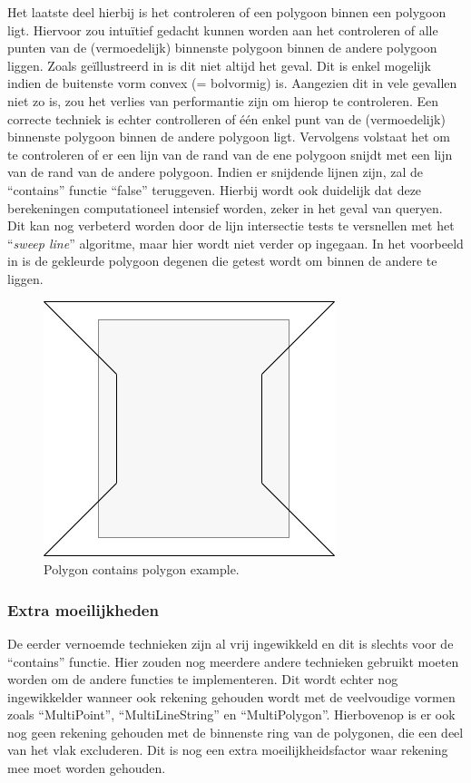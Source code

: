 Het laatste deel hierbij is het controleren of een polygoon binnen een polygoon ligt. Hiervoor zou intuïtief gedacht kunnen worden aan het controleren of alle punten van de (vermoedelijk) binnenste polygoon binnen de andere polygoon liggen. Zoals geïllustreerd in  is dit niet altijd het geval. Dit is enkel mogelijk indien de buitenste vorm convex (= bolvormig) is. Aangezien dit in vele gevallen niet zo is, zou het verlies van performantie zijn om hierop te controleren. Een correcte techniek is echter controlleren of één enkel punt van de (vermoedelijk) binnenste polygoon binnen de andere polygoon ligt. Vervolgens volstaat het om te controleren of er een lijn van de rand van de ene polygoon snijdt met een lijn van de rand van de andere polygoon. Indien er snijdende lijnen zijn, zal de ``contains'' functie ``false'' teruggeven. Hierbij wordt ook duidelijk dat deze berekeningen computationeel intensief worden, zeker in het geval van queryen. Dit kan nog verbeterd worden door de lijn intersectie tests te versnellen met het ``\textit{sweep line}'' algoritme, maar hier wordt niet verder op ingegaan. In het voorbeeld in  is de gekleurde polygoon degenen die getest wordt om binnen de andere te liggen.

\begin{figure}
    \centering
    \includegraphics[width=0.3\linewidth]{images/polygon_contains_polygon.png}
    \caption{Polygon contains polygon example.}
    \label{fig:polygon_contains_polygon}
\end{figure}


\subsubsection{Extra moeilijkheden}
De eerder vernoemde technieken zijn al vrij ingewikkeld en dit is slechts voor de ``contains'' functie. Hier zouden nog meerdere andere technieken gebruikt moeten worden om de andere functies te implementeren. Dit wordt echter nog ingewikkelder wanneer ook rekening gehouden wordt met de veelvoudige vormen zoals ``MultiPoint'', ``MultiLineString'' en ``MultiPolygon''. Hierbovenop is er ook nog geen rekening gehouden met de binnenste ring van de polygonen, die een deel van het vlak excluderen. Dit is nog een extra moeilijkheidsfactor waar rekening mee moet worden gehouden.  

